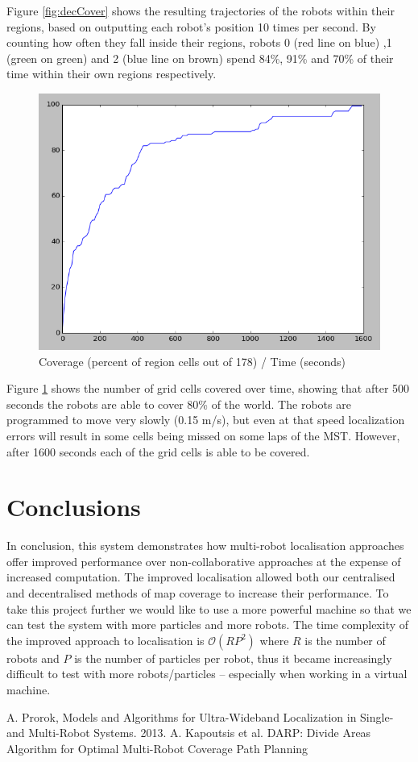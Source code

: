 \documentclass[a4paper, 10pt, conference]{ieeeconf}      %
\begin{document}
Figure \ref{fig:decCover} shows the resulting trajectories of the robots within their regions, based on outputting each robot's position 10 times per second. By counting how often they fall inside their regions, robots 0 (red line on blue) ,1 (green on green) and 2 (blue line on brown) spend 84\%, 91\% and 70\% of their time within their own regions respectively.

\begin{figure}
\centering
	\includegraphics[width=0.8\columnwidth]{dec_t2_line_percent.png}
	\caption{Coverage (percent of region cells out of 178) / Time (seconds)}
    \label{fig:decLine}
\end{figure}

Figure \ref{fig:decLine} shows the number of grid cells covered over time, showing that after 500 seconds the robots are able to cover 80\% of the world. The robots are programmed to move very slowly (0.15 m/s), but even at that speed localization errors will result in some cells being missed on some laps of the MST. However, after 1600 seconds each of the grid cells is able to be covered.

\section{Conclusions}
In conclusion, this system demonstrates how multi-robot localisation approaches offer improved performance over non-collaborative approaches at the expense of increased computation. The improved localisation allowed both our centralised and decentralised methods of map coverage to increase their performance. To take this project further we would like to use a more powerful machine so that we can test the system with more particles and more robots. The time complexity of the improved approach to localisation is $\mathcal{O}(RP^2)$ where $R$ is the number of robots and $P$ is the number of particles per robot, thus it became increasingly difficult to test with more robots/particles -- especially when working in a virtual machine.

\begin{thebibliography}{9}
 A. Prorok, Models and Algorithms for Ultra-Wideband Localization in Single- and Multi-Robot Systems. 2013.
 A. Kapoutsis et al. DARP: Divide Areas Algorithm for Optimal Multi-Robot Coverage Path Planning
\end{thebibliography}
\end{document}
